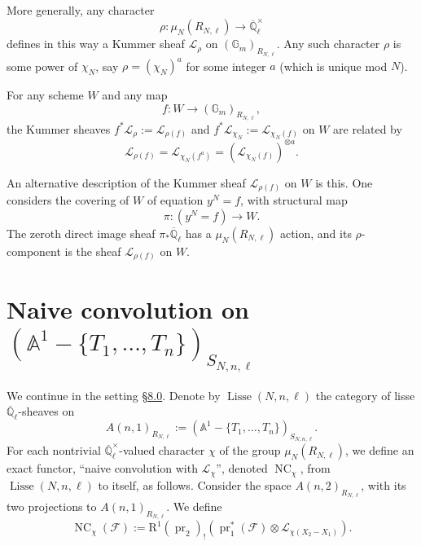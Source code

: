 More generally, any character
\[
\rho:\mu_N(R_{N,\ell})\to\overline{\mathbb{Q}}_\ell^{\times}
\]
defines in this way a Kummer sheaf \(\mathcal{L}_\rho\) on \((\mathbb{G}_m)_{R_{N,\ell}}\). Any such character \(\rho\) is some power of \(\chi_N\), say \(\rho=(\chi_N)^a\) for some integer \(a\) (which is unique mod \(N\)).

For any scheme \(W\) and any map
\[
f:W\to(\mathbb{G}_m)_{R_{N,\ell}},
\]
the Kummer sheaves \(f^*\mathcal{L}_\rho:=\mathcal{L}_{\rho(f)}\) and \(f^*\mathcal{L}_{\chi_N}:=\mathcal{L}_{\chi_N(f)}\) on \(W\) are related by
\[
\mathcal{L}_{\rho(f)}=\mathcal{L}_{\chi_N(f^a)}=(\mathcal{L}_{\chi_N(f)})^{\otimes a}.
\]

An alternative description of the Kummer sheaf \(\mathcal{L}_{\rho(f)}\) on \(W\) is this. One considers the covering of \(W\) of equation \(y^N=f\), with structural map
\[
\pi:(y^N=f)\to W.
\]
The zeroth direct image sheaf \(\pi_*\overline{\mathbb{Q}}_\ell\) has a \(\mu_N(R_{N,\ell})\) action, and its \(\rho\)-component is the sheaf \(\mathcal{L}_{\rho(f)}\) on \(W\).

\section[Naive convolution on the punctured affine line]{Naive convolution on \((\mathbb{A}^1-\{T_1,\ldots,T_n\})_{S_{N,n,\ell}}\)}
\label{sec:8.2}

We continue in the setting \hyperref[sec:8.0]{\S8.0}. Denote by \(\operatorname{Lisse}(N,n,\ell)\) the category of lisse \(\overline{\mathbb{Q}}_\ell\)-sheaves on
\[
A(n,1)_{R_{N,\ell}}:=(\mathbb{A}^1-\{T_1,\ldots,T_n\})_{S_{N,n,\ell}}.
\]
For each nontrivial \(\overline{\mathbb{Q}}_\ell^{\times}\)-valued character \(\chi\) of the group \(\mu_N(R_{N,\ell})\), we define an exact functor, ``naive convolution with \(\mathcal{L}_\chi\)'', denoted \(\operatorname{NC}_\chi\), from \(\operatorname{Lisse}(N,n,\ell)\) to itself, as follows. Consider the space \(A(n,2)_{R_{N,\ell}}\), with its two projections to \(A(n,1)_{R_{N,\ell}}\). We define
\[
\operatorname{NC}_\chi(\mathcal{F}):=\mathrm{R}^1(\operatorname{pr}_2)_!(\operatorname{pr}_1^*(\mathcal{F})\otimes\mathcal{L}_{\chi(X_2-X_1)}).
\]

